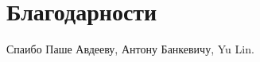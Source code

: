 \thispagestyle{empty}
\setcounter{page}{1}

\section*{Благодарности}
\noindent

Спаибо Паше Авдееву, Антону Банкевичу, Yu Lin.

\pagebreak

